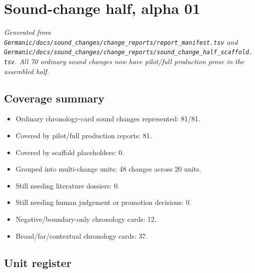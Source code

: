 \documentclass[
  british,
  a4paper,
]{article}
\author{}
\date{}
\providecommand{\tightlist}{%
  \setlength{\itemsep}{0pt}\setlength{\parskip}{0pt}}
\begin{document}
\section{Sound-change half, alpha 01}\label{sound-change-half-alpha-01}

\emph{Generated from
\texttt{Germanic/docs/sound\_changes/change\_reports/report\_manifest.tsv}
and
\texttt{Germanic/docs/sound\_changes/change\_reports/sound\_change\_half\_scaffold.tsv}.
All 70 ordinary sound changes now have pilot/full production prose in
the assembled half.}

\subsection{Coverage summary}\label{coverage-summary}

\begin{itemize}
\tightlist
\item
  Ordinary chronology-card sound changes represented: 81/81.
\item
  Covered by pilot/full production reports: 81.
\item
  Covered by scaffold placeholders: 0.
\item
  Grouped into multi-change units: 48 changes across 20 units.
\item
  Still needing literature dossiers: 0.
\item
  Still needing human judgement or promotion decisions: 0.
\item
  Negative/boundary-only chronology cards: 12.
\item
  Broad/far/contextual chronology cards: 37.
\end{itemize}

\subsection{Unit register}\label{unit-register}
\end{document}
